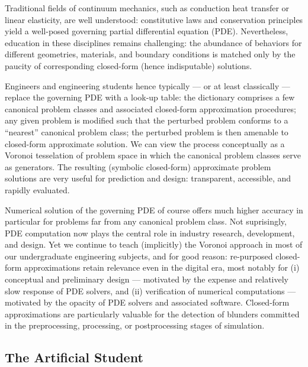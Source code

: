 \documentclass[preprint,12pt]{article}
\begin{document}
Traditional fields of continuum mechanics, such as conduction heat transfer or linear elasticity, are well understood: constitutive laws and conservation principles yield a well-posed governing partial differential equation (PDE). Nevertheless, education in these  disciplines remains challenging: the abundance of behaviors for different geometries, materials, and boundary conditions is matched only by the paucity of corresponding closed-form (hence indisputable) solutions.

Engineers and engineering students hence typically --- or at least classically --- replace the governing PDE with a look-up table: the dictionary comprises a few canonical problem classes and associated closed-form approximation procedures; any given problem is modified such that the perturbed problem conforms to a ``nearest'' canonical problem class; the perturbed problem is then amenable to closed-form approximate solution. We can view the process conceptually as a Voronoi tesselation of problem space in which the canonical problem classes serve as generators. The resulting (symbolic closed-form) approximate problem solutions are very useful for prediction and design: transparent, accessible, and rapidly evaluated.

Numerical solution of the governing PDE of course offers much higher accuracy in particular for problems far from any canonical problem class. Not suprisingly, PDE computation now plays the central role in industry research, development, and design. Yet we continue to teach (implicitly) the Voronoi approach in most of our undergraduate engineering subjects, and for good reason: re-purposed closed-form approximations retain relevance even in the digital era, most notably for (i) conceptual and preliminary design --- motivated by the expense and relatively slow response of PDE solvers, and  (ii) verification of numerical computations --- motivated by the opacity of PDE solvers and associated software. Closed-form approximations are particularly valuable for the detection of blunders committed in the preprocessing, processing, or postprocessing stages of simulation.

\subsection{The Artificial Student} 
\end{document}
